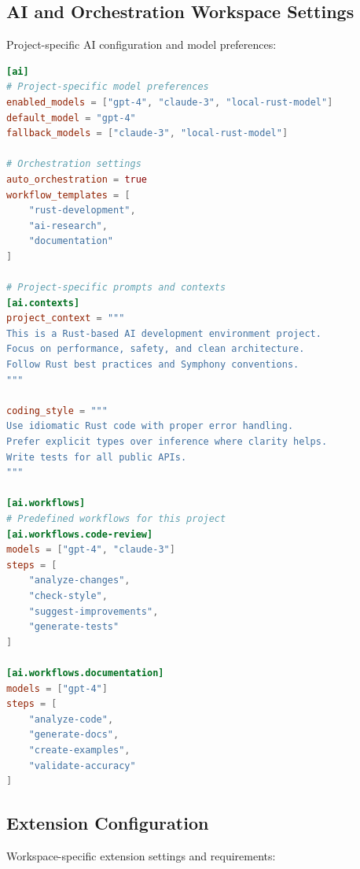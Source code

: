 \subsection*{AI and Orchestration Workspace Settings}

Project-specific AI configuration and model preferences:

\begin{lstlisting}[language=toml,caption={Workspace AI Configuration}]
[ai]
# Project-specific model preferences
enabled_models = ["gpt-4", "claude-3", "local-rust-model"]
default_model = "gpt-4"
fallback_models = ["claude-3", "local-rust-model"]

# Orchestration settings
auto_orchestration = true
workflow_templates = [
    "rust-development",
    "ai-research",
    "documentation"
]

# Project-specific prompts and contexts
[ai.contexts]
project_context = """
This is a Rust-based AI development environment project.
Focus on performance, safety, and clean architecture.
Follow Rust best practices and Symphony conventions.
"""

coding_style = """
Use idiomatic Rust code with proper error handling.
Prefer explicit types over inference where clarity helps.
Write tests for all public APIs.
"""

[ai.workflows]
# Predefined workflows for this project
[ai.workflows.code-review]
models = ["gpt-4", "claude-3"]
steps = [
    "analyze-changes",
    "check-style",
    "suggest-improvements",
    "generate-tests"
]

[ai.workflows.documentation]
models = ["gpt-4"]
steps = [
    "analyze-code",
    "generate-docs",
    "create-examples",
    "validate-accuracy"
]
\end{lstlisting}

\subsection*{Extension Configuration}

Workspace-specific extension settings and requirements:

